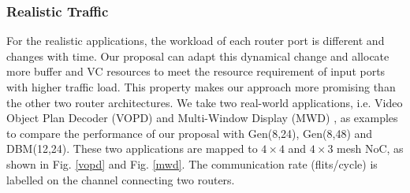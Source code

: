 \documentclass[10pt,conference]{IEEEtran}
\begin{document}
\subsubsection{Realistic Traffic}
For the realistic applications, the workload of each router port is different and changes with time. Our proposal can adapt this dynamical change and allocate more buffer and VC resources to meet the resource requirement of input ports with higher traffic load. This property makes our approach more promising than the other two router architectures. We take two real-world applications, i.e. Video Object Plan Decoder (VOPD) \cite{6553191} and Multi-Window Display (MWD) \cite{1374853}, as examples to compare the performance of our proposal with Gen(8,24), Gen(8,48) and DBM(12,24). These two applications are mapped to $4\times 4$ and $4\times 3$ mesh NoC, as shown in Fig. \ref{vopd} and Fig. \ref{mwd}. The communication rate (flits/cycle) is labelled on the channel connecting two routers.

\end{document}
